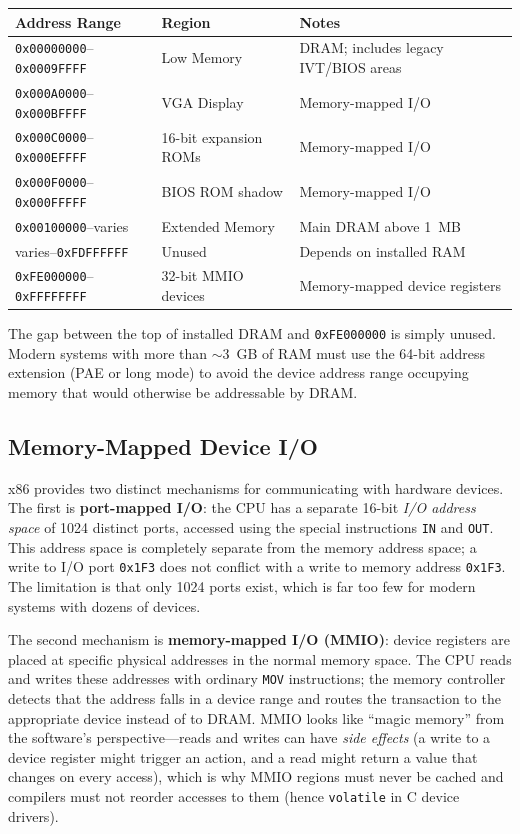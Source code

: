 \documentclass[11pt]{article}
\begin{document}
\begin{center}
\begin{tabular}{lll}
\toprule
\textbf{Address Range} & \textbf{Region} & \textbf{Notes} \\
\midrule
\texttt{0x00000000}--\texttt{0x0009FFFF} & Low Memory          & DRAM; includes legacy IVT/BIOS areas \\
\texttt{0x000A0000}--\texttt{0x000BFFFF} & VGA Display         & Memory-mapped I/O \\
\texttt{0x000C0000}--\texttt{0x000EFFFF} & 16-bit expansion ROMs & Memory-mapped I/O \\
\texttt{0x000F0000}--\texttt{0x000FFFFF} & BIOS ROM shadow     & Memory-mapped I/O \\
\texttt{0x00100000}--varies              & Extended Memory     & Main DRAM above 1~MB \\
varies--\texttt{0xFDFFFFFF}             & Unused              & Depends on installed RAM \\
\texttt{0xFE000000}--\texttt{0xFFFFFFFF} & 32-bit MMIO devices & Memory-mapped device registers \\
\bottomrule
\end{tabular}
\end{center}

The gap between the top of installed DRAM and \texttt{0xFE000000} is simply unused. Modern
systems with more than $\sim$3~GB of RAM must use the 64-bit address extension (PAE or long
mode) to avoid the device address range occupying memory that would otherwise be addressable
by DRAM.

\subsection{Memory-Mapped Device I/O}

x86 provides two distinct mechanisms for communicating with hardware devices. The first is
\textbf{port-mapped I/O}: the CPU has a separate 16-bit \emph{I/O address space} of 1024
distinct ports, accessed using the special instructions \texttt{IN} and \texttt{OUT}. This
address space is completely separate from the memory address space; a write to I/O port
\texttt{0x1F3} does not conflict with a write to memory address \texttt{0x1F3}. The
limitation is that only 1024 ports exist, which is far too few for modern systems with dozens
of devices.

The second mechanism is \textbf{memory-mapped I/O (MMIO)}: device registers are placed at
specific physical addresses in the normal memory space. The CPU reads and writes these
addresses with ordinary \texttt{MOV} instructions; the memory controller detects that the
address falls in a device range and routes the transaction to the appropriate device instead
of to DRAM. MMIO looks like ``magic memory'' from the software's perspective---reads and
writes can have \emph{side effects} (a write to a device register might trigger an action,
and a read might return a value that changes on every access), which is why MMIO regions must
never be cached and compilers must not reorder accesses to them (hence \texttt{volatile} in C
device drivers).
\end{document}
